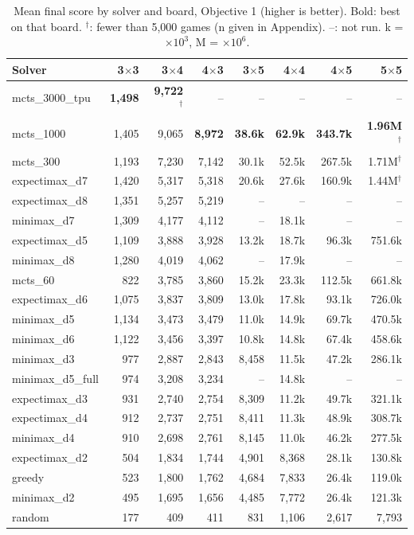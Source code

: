 \begin{table}[t]
\centering\small
\caption{Mean final score by solver and board, Objective 1 (higher is better). Bold: best on that board. $^\dagger$: fewer than 5{,}000 games (n given in Appendix). --: not run. k = $\times10^3$, M = $\times10^6$.}
\label{tab:mean_obj1}
\begin{tabular}{lrrrrrrr}
\toprule
Solver & 3$\times$3 & 3$\times$4 & 4$\times$3 & 3$\times$5 & 4$\times$4 & 4$\times$5 & 5$\times$5 \\
\midrule
mcts\_3000\_tpu & \textbf{1{,}498} & \textbf{9{,}722}$^\dagger$ & -- & -- & -- & -- & -- \\
mcts\_1000 & 1{,}405 & 9{,}065 & \textbf{8{,}972} & \textbf{38.6k} & \textbf{62.9k} & \textbf{343.7k} & \textbf{1.96M}$^\dagger$ \\
mcts\_300 & 1{,}193 & 7{,}230 & 7{,}142 & 30.1k & 52.5k & 267.5k & 1.71M$^\dagger$ \\
expectimax\_d7 & 1{,}420 & 5{,}317 & 5{,}318 & 20.6k & 27.6k & 160.9k & 1.44M$^\dagger$ \\
expectimax\_d8 & 1{,}351 & 5{,}257 & 5{,}219 & -- & -- & -- & -- \\
minimax\_d7 & 1{,}309 & 4{,}177 & 4{,}112 & -- & 18.1k & -- & -- \\
expectimax\_d5 & 1{,}109 & 3{,}888 & 3{,}928 & 13.2k & 18.7k & 96.3k & 751.6k \\
minimax\_d8 & 1{,}280 & 4{,}019 & 4{,}062 & -- & 17.9k & -- & -- \\
mcts\_60 & 822 & 3{,}785 & 3{,}860 & 15.2k & 23.3k & 112.5k & 661.8k \\
expectimax\_d6 & 1{,}075 & 3{,}837 & 3{,}809 & 13.0k & 17.8k & 93.1k & 726.0k \\
minimax\_d5 & 1{,}134 & 3{,}473 & 3{,}479 & 11.0k & 14.9k & 69.7k & 470.5k \\
minimax\_d6 & 1{,}122 & 3{,}456 & 3{,}397 & 10.8k & 14.8k & 67.4k & 458.6k \\
minimax\_d3 & 977 & 2{,}887 & 2{,}843 & 8{,}458 & 11.5k & 47.2k & 286.1k \\
minimax\_d5\_full & 974 & 3{,}208 & 3{,}234 & -- & 14.8k & -- & -- \\
expectimax\_d3 & 931 & 2{,}740 & 2{,}754 & 8{,}309 & 11.2k & 49.7k & 321.1k \\
expectimax\_d4 & 912 & 2{,}737 & 2{,}751 & 8{,}411 & 11.3k & 48.9k & 308.7k \\
minimax\_d4 & 910 & 2{,}698 & 2{,}761 & 8{,}145 & 11.0k & 46.2k & 277.5k \\
expectimax\_d2 & 504 & 1{,}834 & 1{,}744 & 4{,}901 & 8{,}368 & 28.1k & 130.8k \\
greedy & 523 & 1{,}800 & 1{,}762 & 4{,}684 & 7{,}833 & 26.4k & 119.0k \\
minimax\_d2 & 495 & 1{,}695 & 1{,}656 & 4{,}485 & 7{,}772 & 26.4k & 121.3k \\
random & 177 & 409 & 411 & 831 & 1{,}106 & 2{,}617 & 7{,}793 \\
\bottomrule
\end{tabular}
\end{table}